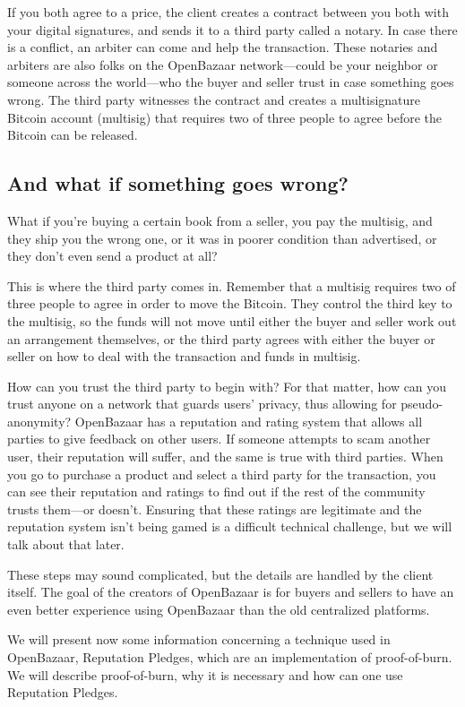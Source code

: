 \documentclass[journal]{IEEEtran}
\begin{document}
If you both agree to a price, the client creates a contract between you both with your digital signatures, and sends it to a third party called a notary. In case there is a conflict, an arbiter can come and help the transaction. These notaries and arbiters are also folks on the OpenBazaar network—could be your neighbor or someone across the world—who the buyer and seller trust in case something goes wrong. The third party witnesses the contract and creates a multisignature Bitcoin account (multisig) that requires two of three people to agree before the Bitcoin can be released.

\subsection{And what if something goes wrong?}
What if you’re buying a certain book from a seller, you pay the multisig, and they ship you the wrong one, or it was in poorer condition than advertised, or they don’t even send a product at all?

This is where the third party comes in. Remember that a multisig requires two of three people to agree in order to move the Bitcoin. They control the third key to the multisig, so the funds will not move until either the buyer and seller work out an arrangement themselves, or the third party agrees with either the buyer or seller on how to deal with the transaction and funds in multisig.

How can you trust the third party to begin with? For that matter, how can you trust anyone on a network that guards users’ privacy, thus allowing for pseudo-anonymity? OpenBazaar has a reputation and rating system that allows all parties to give feedback on other users. If someone attempts to scam another user, their reputation will suffer, and the same is true with third parties. When you go to purchase a product and select a third party for the transaction, you can see their reputation and ratings to find out if the rest of the community trusts them—or doesn’t. Ensuring that these ratings are legitimate and the reputation system isn’t being gamed is a difficult technical challenge, but we will talk about that later.

These steps may sound complicated, but the details are handled by the client itself. The goal of the creators of OpenBazaar is for buyers and sellers to have an even better experience using OpenBazaar than the old centralized platforms.

We will present now some information concerning a technique used in OpenBazaar, Reputation Pledges, which are an implementation of proof-of-burn. We will describe proof-of-burn, why it is necessary and how can one use Reputation Pledges. 
\end{document}
